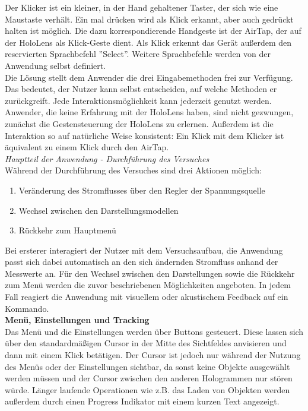 Der Klicker ist ein kleiner, in der Hand gehaltener Taster, der sich wie eine Maustaste verhält. Ein mal drücken wird als Klick erkannt, aber auch gedrückt halten ist möglich.
Die dazu korrespondierende Handgeste ist der AirTap, der auf der HoloLens als Klick-Geste dient. Als Klick erkennt das Gerät außerdem den reservierten Sprachbefehl ''Select''. Weitere Sprachbefehle werden von der Anwendung selbst definiert.\\

Die Lösung stellt dem Anwender die drei Eingabemethoden frei zur Verfügung. Das bedeutet, der Nutzer kann selbst entscheiden, auf welche Methoden er zurückgreift. Jede Interaktionsmöglichkeit kann jederzeit genutzt werden. Anwender, die keine Erfahrung mit der HoloLens haben, sind nicht gezwungen, zunächst die Gestensteuerung der HoloLens zu erlernen. Außerdem ist die Interaktion so auf natürliche Weise konsistent: Ein Klick mit dem Klicker ist äquivalent zu einem Klick durch den AirTap.\\

\textit{Hauptteil der Anwendung - Durchführung des Versuches}\\
Während der Durchführung des Versuches sind drei Aktionen möglich:
\begin{enumerate}[topsep=-2px]
	\setlength{\itemsep}{-5pt}
	\item Veränderung des Stromflusses über den Regler der Spannungsquelle
	\item Wechsel zwischen den Darstellungsmodellen
	\item Rückkehr zum Hauptmenü
\end{enumerate}
\vspace{8px}

Bei ersterer interagiert der Nutzer mit dem Versuchsaufbau, die Anwendung passt sich dabei automatisch an den sich ändernden Stromfluss anhand der Messwerte an. Für den Wechsel zwischen den Darstellungen sowie die Rückkehr zum Menü werden die zuvor beschriebenen Möglichkeiten angeboten. In jedem Fall reagiert die Anwendung mit visuellem oder akustischem Feedback auf ein Kommando.\\

\textbf{Menü, Einstellungen und Tracking}\\
Das Menü und die Einstellungen werden über Buttons gesteuert. Diese lassen sich über den standardmäßigen Cursor in der Mitte des Sichtfeldes anvisieren und dann mit einem Klick betätigen. Der Cursor ist jedoch nur während der Nutzung des Menüs oder der Einstellungen sichtbar, da sonst keine Objekte ausgewählt werden müssen und der Cursor zwischen den anderen Hologrammen nur stören würde. Länger laufende Operationen wie z.B. das Laden von Objekten werden außerdem durch einen Progress Indikator mit einem kurzen Text angezeigt.\\

